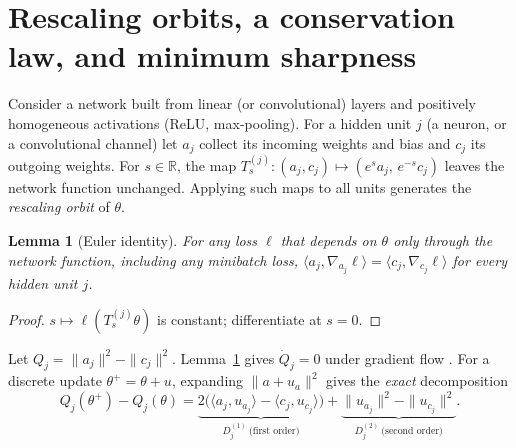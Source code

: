 \documentclass[10pt]{article}
\newtheorem{lemma}{Lemma}
\theoremstyle{remark}
\newcommand{\R}{\mathbb{R}}
\begin{document}
\section{Rescaling orbits, a conservation law, and minimum sharpness}\label{sec:setup}
Consider a network built from linear (or convolutional) layers and positively homogeneous activations (ReLU, max-pooling). For a hidden unit $j$ (a neuron, or a convolutional channel) let $a_j$ collect its incoming weights and bias and $c_j$ its outgoing weights. For $s\in\R$, the map $T^{(j)}_s:(a_j,c_j)\mapsto(e^{s}a_j,\,e^{-s}c_j)$ leaves the network function unchanged. Applying such maps to all units generates the \emph{rescaling orbit} of $\theta$.

\begin{lemma}[Euler identity]\label{lem:euler}
For any loss $\ell$ that depends on $\theta$ only through the network function, including any minibatch loss, $\langle a_j,\nabla_{a_j}\ell\rangle=\langle c_j,\nabla_{c_j}\ell\rangle$ for every hidden unit $j$.
\end{lemma}
\begin{proof}
$s\mapsto\ell(T^{(j)}_s\theta)$ is constant; differentiate at $s=0$.
\end{proof}

Let $Q_j=\|a_j\|^2-\|c_j\|^2$. Lemma~\ref{lem:euler} gives $\dot Q_j=0$ under gradient flow \citep{du2018algorithmic}. For a discrete update $\theta^+=\theta+u$, expanding $\|a+u_a\|^2$ gives the \emph{exact} decomposition
\begin{equation}\label{eq:decomp}
Q_j(\theta^+)-Q_j(\theta)=\underbrace{2\big(\langle a_j,u_{a_j}\rangle-\langle c_j,u_{c_j}\rangle\big)}_{D^{(1)}_j\ \text{(first order)}}+\underbrace{\|u_{a_j}\|^2-\|u_{c_j}\|^2}_{D^{(2)}_j\ \text{(second order)}}.
\end{equation}
\end{document}
